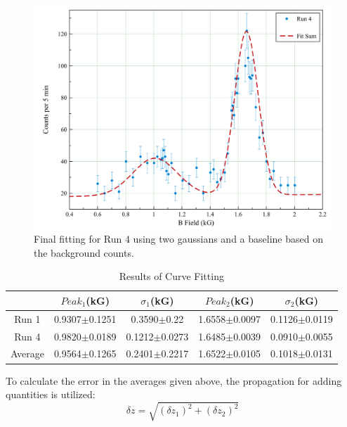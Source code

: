 \begin{figure}[H]
\begin{center}
\includegraphics[width=4 in]{run4_err_fit.png}
\caption{Final fitting for Run 4 using two gaussians and a baseline based on the background counts.}
\end{center}
\end{figure}

\begin{table}
\begin{center}
\caption{Results of Curve Fitting}
\begin{tabular}{|c|c|c|c|c|}\hline
&$Peak_1$(kG) &$\sigma_1$(kG)&$Peak_2$(kG) &$\sigma_2$(kG)  \\ \hline
Run 1 &0.9307$\pm$0.1251 & 0.3590$\pm$0.22 & 1.6558$\pm$0.0097 &0.1126$\pm$0.0119 \\ \hline
Run 4 &0.9820$\pm$0.0189 &0.1212$\pm$0.0273 &1.6485$\pm$0.0039 &0.0910$\pm$0.0055\\ \hline
Average &0.9564$\pm$0.1265 &0.2401$\pm$0.2217 &1.6522$\pm$0.0105 &0.1018$\pm$0.0131 \\ \hline
\end{tabular}
\end{center}
\end{table}%

To calculate the error in the averages given above, the propagation for adding quantities is utilized:
\begin{equation} \delta z=\sqrt{(\delta z_1)^2 + (\delta z_2)^2} \end {equation}

